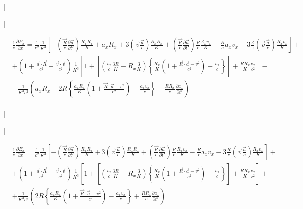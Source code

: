 \documentclass[11pt]{article}
\begin{document}
{]}

{[}

\begin{align}
  & \frac{1}{e}\frac{\partial {{E}_{x}}}{\partial x}=\frac{1}{{{c}^{2}}}\frac{1}{{{K}^{3}}}\left[ -\left( \frac{\overrightarrow{R}}{c}\frac{\partial \overrightarrow{a}}{\partial t'} \right)\frac{{{R}_{x}}{{R}_{x}}}{K}+{{a}_{x}}{{R}_{x}}+3\left( \overrightarrow{v}\frac{\overrightarrow{a}}{c} \right)\frac{{{R}_{x}}{{R}_{x}}}{K}+\left( \frac{\overrightarrow{R}}{c}\frac{\partial \overrightarrow{a}}{\partial t'} \right)\frac{R}{c}\frac{{{R}_{x}}{{v}_{x}}}{K}-\frac{R}{c}{{a}_{x}}{{v}_{x}}-3\frac{R}{c}\left( \overrightarrow{v}\frac{\overrightarrow{a}}{c} \right)\frac{{{R}_{x}}{{v}_{x}}}{K} \right]+ \\ 
 & +\left( 1+\frac{\overrightarrow{a}\cdot \overrightarrow{R}}{{{c}^{2}}}-\frac{\overrightarrow{v}\cdot \overrightarrow{v}}{{{c}^{2}}} \right)\frac{1}{{{K}^{3}}}\left[ 1+\left[ \left( \frac{{{v}_{x}}}{c}\frac{3R}{K}-{{R}_{x}}\frac{3}{K} \right)\left\{ \frac{{{R}_{x}}}{K}\left( 1+\frac{\overrightarrow{R}\cdot \overrightarrow{a}-{{v}^{2}}}{{{c}^{2}}} \right)-\frac{{{v}_{x}}}{c} \right\} \right]+\frac{R{{R}_{x}}}{K}\frac{{{a}_{x}}}{{{c}^{2}}} \right]- \\ 
 & -\frac{1}{{{K}^{3}}{{c}^{2}}}\left( {{a}_{x}}{{R}_{x}}-2R\left\{ \frac{{{a}_{x}}{{R}_{x}}}{K}\left( 1+\frac{\overrightarrow{R}\cdot \overrightarrow{a}-{{v}^{2}}}{{{c}^{2}}} \right)-\frac{{{a}_{x}}{{v}_{x}}}{c} \right\}-\frac{R{{R}_{x}}}{c}\frac{\partial {{a}_{x}}}{\partial t'} \right) \\ 
\end{align}

{]}

{[}

\begin{align}
  & \frac{1}{e}\frac{\partial {{E}_{x}}}{\partial x}=\frac{1}{{{c}^{2}}}\frac{1}{{{K}^{3}}}\left[ -\left( \frac{\overrightarrow{R}}{c}\frac{\partial \overrightarrow{a}}{\partial t'} \right)\frac{{{R}_{x}}{{R}_{x}}}{K}+3\left( \overrightarrow{v}\frac{\overrightarrow{a}}{c} \right)\frac{{{R}_{x}}{{R}_{x}}}{K}+\left( \frac{\overrightarrow{R}}{c}\frac{\partial \overrightarrow{a}}{\partial t'} \right)\frac{R}{c}\frac{{{R}_{x}}{{v}_{x}}}{K}-\frac{R}{c}{{a}_{x}}{{v}_{x}}-3\frac{R}{c}\left( \overrightarrow{v}\frac{\overrightarrow{a}}{c} \right)\frac{{{R}_{x}}{{v}_{x}}}{K} \right]+ \\ 
 & +\left( 1+\frac{\overrightarrow{a}\cdot \overrightarrow{R}}{{{c}^{2}}}-\frac{\overrightarrow{v}\cdot \overrightarrow{v}}{{{c}^{2}}} \right)\frac{1}{{{K}^{3}}}\left[ 1+\left[ \left( \frac{{{v}_{x}}}{c}\frac{3R}{K}-{{R}_{x}}\frac{3}{K} \right)\left\{ \frac{{{R}_{x}}}{K}\left( 1+\frac{\overrightarrow{R}\cdot \overrightarrow{a}-{{v}^{2}}}{{{c}^{2}}} \right)-\frac{{{v}_{x}}}{c} \right\} \right]+\frac{R{{R}_{x}}}{K}\frac{{{a}_{x}}}{{{c}^{2}}} \right]+ \\ 
 & +\frac{1}{{{K}^{3}}{{c}^{2}}}\left( 2R\left\{ \frac{{{a}_{x}}{{R}_{x}}}{K}\left( 1+\frac{\overrightarrow{R}\cdot \overrightarrow{a}-{{v}^{2}}}{{{c}^{2}}} \right)-\frac{{{a}_{x}}{{v}_{x}}}{c} \right\}+\frac{R{{R}_{x}}}{c}\frac{\partial {{a}_{x}}}{\partial t'} \right) \\ 
\end{align}
\end{document}
